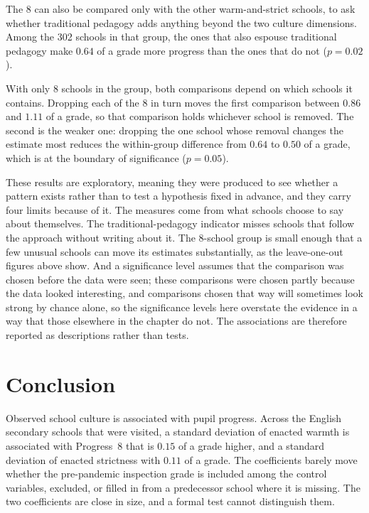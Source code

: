 The 8 can also be compared only with the other warm-and-strict schools, to ask whether traditional pedagogy adds anything beyond the two culture dimensions. Among the 302 schools in that group, the ones that also espouse traditional pedagogy make $0.64$ of a grade more progress than the ones that do not ($p = 0.02$).

With only 8 schools in the group, both comparisons depend on which schools it contains. Dropping each of the 8 in turn moves the first comparison between $0.86$ and $1.11$ of a grade, so that comparison holds whichever school is removed. The second is the weaker one: dropping the one school whose removal changes the estimate most reduces the within-group difference from $0.64$ to $0.50$ of a grade, which is at the boundary of significance ($p = 0.05$).

These results are exploratory, meaning they were produced to see whether a pattern exists rather than to test a hypothesis fixed in advance, and they carry four limits because of it. The measures come from what schools choose to say about themselves. The traditional-pedagogy indicator misses schools that follow the approach without writing about it. The 8-school group is small enough that a few unusual schools can move its estimates substantially, as the leave-one-out figures above show. And a significance level assumes that the comparison was chosen before the data were seen; these comparisons were chosen partly because the data looked interesting, and comparisons chosen that way will sometimes look strong by chance alone, so the significance levels here overstate the evidence in a way that those elsewhere in the chapter do not. The associations are therefore reported as descriptions rather than tests.

\section{Conclusion}
\label{sec:p2_conclusion}

Observed school culture is associated with pupil progress. Across the
\NTierOne{}
English secondary schools that were visited, a standard deviation of enacted warmth is associated with Progress~8 that is $0.15$ of a grade higher, and a standard deviation of enacted strictness with $0.11$ of a grade. The coefficients barely move whether the pre-pandemic inspection grade is included among the control variables, excluded, or filled in from a predecessor school where it is missing. The two coefficients are close in size, and a formal test cannot distinguish them.

